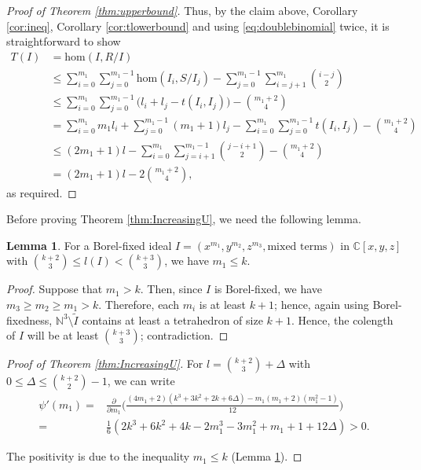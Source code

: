 \documentclass[11pt,a4paper,leqno,noamsfonts]{amsart}
\numberwithin{equation}{section}
\newcommand{\BC}{{\mathbb{C}}}
\newcommand{\BN}{{\mathbb{N}}}
\theoremstyle{definition}
\theoremstyle{thm}
\newtheorem{lemma}[definition]{Lemma}
\theoremstyle{ex}
\theoremstyle{sol}
\begin{document}
\begin{proof}[Proof of Theorem \ref{thm:upperbound}]
Thus, by the claim above, Corollary \ref{cor:ineq}, Corollary  \ref{cor:tlowerbound} and using \eqref{eq:doublebinomial} twice, it is straightforward to show
\begin{align*}
    T(I)&=\mathrm{hom}(I,R/I)\\
    &\leq\sum_{i=0}^{m_1}\sum_{j=0}^{m_1-1}\mathrm{hom}(I_i,S/I_j)-\sum_{j=0}^{m_1-1}\sum_{i=j+1}^{m_1}\binom{i-j}{2}\\
    &\leq\sum_{i=0}^{m_1}\sum_{j=0}^{m_1-1}\big(l_i+l_j-t(I_i,I_j)\big)-\binom{m_1+2}{4}\\
    &=\sum_{i=0}^{m_1}m_1l_i+\sum_{j=0}^{m_1-1}(m_1+1)l_j-\sum_{i=0}^{m_1}\sum_{j=0}^{m_1-1}t(I_i,I_j)-\binom{m_1+2}{4}\\
    &\leq(2m_1+1)l-\sum_{i=0}^{m_1}\sum_{j=i+1}^{m_1-1}\binom{j-i+1}{2}-\binom{m_1+2}{4}\\
    &=(2m_1+1)l-2\binom{m_1+2}{4},
\end{align*}
as required.
\end{proof}


Before proving Theorem \ref{thm:IncreasingU}, we need the following lemma.

\begin{lemma}\label{lem: m1Leqk}
    For a Borel-fixed ideal $I=(x^{m_1},y^{m_2},z^{m_3},\text{mixed terms})$  in $\BC[x,y,z]$ with  ${k+2 \choose 3}\leq l(I) <{k+3 \choose 3}$, we have $m_1\leq k$. 
\end{lemma}
\begin{proof}
Suppose that $m_1>k$. Then, since $I$ is Borel-fixed, we have $m_3\geq m_2 \geq m_1>k$. Therefore, each $m_i$ is at least $k+1$; hence, again using Borel-fixedness,
$\BN^3\setminus \tilde{I}$ contains at least a tetrahedron of size $k+1$. Hence,
the colength of $I$ will be at least ${k+3 \choose 3}$; contradiction.
\end{proof}
\begin{proof}[Proof of Theorem \ref{thm:IncreasingU}] For $l={k+2\choose 3}+\Delta$ with $0 \leq \Delta \leq {k+2\choose 2}-1$, we can write
\begin{align*}
    \psi'(m_1)=&\frac{\partial}{\partial m_1}\Bigg(\frac{(4m_1+2)(k^3+3k^2+2k+6\Delta)-m_1(m_1+2)(m_1^2-1)}{12}\Bigg)\\
    =&\frac{1}{6}(2k^3+6k^2+4k-2m_1^3-3m_1^2+m_1+1+12\Delta)>0.
\end{align*}

   The positivity is due to the inequality $m_1\leq k$ (Lemma \ref{lem: m1Leqk}).
\end{proof}
\end{document}
